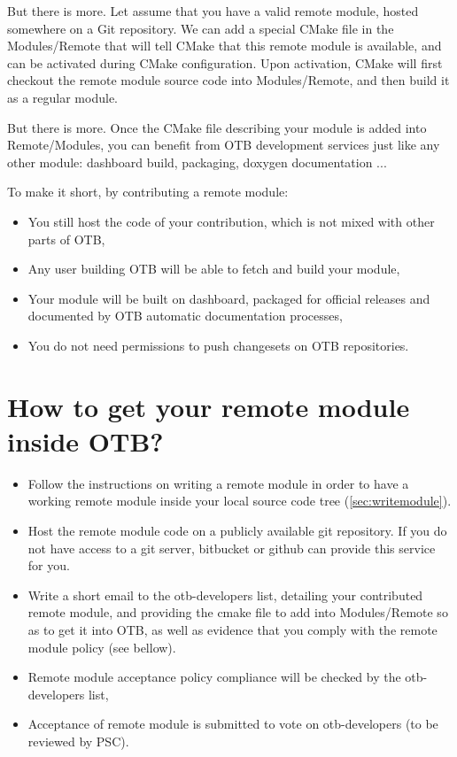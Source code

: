 But there is more. Let assume that you have a valid remote module, hosted somewhere on a Git repository. We can add a special CMake file in the Modules/Remote that will tell CMake that this remote module is available, and can be activated during CMake configuration. Upon activation, CMake will first checkout the remote module source code into Modules/Remote, and then build it as a regular module.

But there is more. Once the CMake file describing your module is added into Remote/Modules, you can benefit from OTB development services just like any other module: dashboard build, packaging, doxygen documentation ...

To make it short, by contributing a remote module:

\begin{itemize}
       \item  You still host the code of your contribution, which is not mixed with other parts of OTB,
       \item  Any user building OTB will be able to fetch and build your module,
       \item  Your module will be built on dashboard, packaged for official releases and documented by OTB automatic documentation processes,
       \item  You do not need permissions to push changesets on OTB repositories.
\end{itemize}

\section{How to get your remote module inside OTB? }

\begin{itemize}
    \item Follow the instructions on writing a remote module in order to have a working remote module inside your local source code tree (\ref{sec:writemodule}).
    \item Host the remote module code on a publicly available git repository. If you do not have access to a git server, bitbucket or github can provide this service for you.
    \item Write a short email to the otb-developers list, detailing your contributed remote module, and providing the cmake file to add into Modules/Remote so as to get it into OTB, as well as evidence that you comply with the remote module policy (see bellow).
    \item Remote module acceptance policy compliance will be checked by the otb-developers list,
    \item Acceptance of remote module is submitted to vote on otb-developers (to be reviewed by PSC). 
 \end{itemize}

